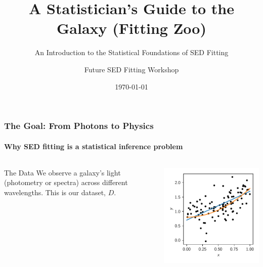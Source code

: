 \documentclass[aspectratio=169]{beamer}
\title{A Statistician's Guide to the Galaxy (Fitting Zoo)}
\subtitle{An Introduction to the Statistical Foundations of SED Fitting}
\author{Future SED Fitting Workshop}
\date{\today}
\begin{document}
\begin{frame}
    \titlepage
\end{frame}

\begin{frame}
    \frametitle{The Goal: From Photons to Physics}
    \framesubtitle{Why SED fitting is a statistical inference problem}
    \begin{columns}[T]
        \begin{block}{The Data}
            We observe a galaxy's light (photometry or spectra) across different wavelengths. This is our dataset, $D$.
        \end{block}
        \includegraphics[width=\textwidth]{figures/data_points.pdf} %
        

\end{columns}
\end{frame}
\end{document}
